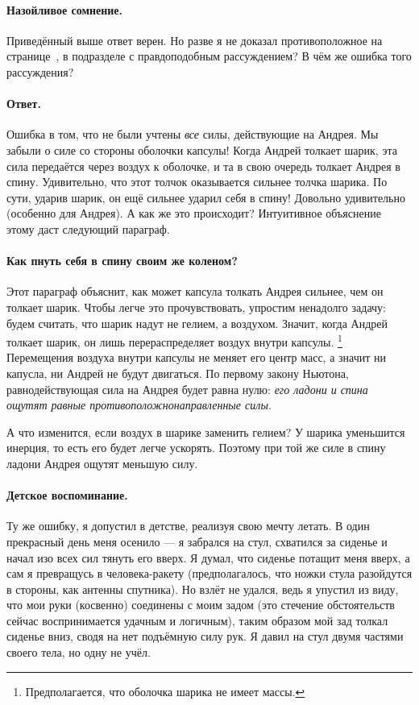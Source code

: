 \paragraph{Назойливое сомнение.}
Приведённый выше ответ верен.
Но разве я не доказал противоположное на странице~\pageref{Првдоподобное рассуждение}, в подразделе с правдоподобным рассуждением?
В чём же ошибка того рассуждения?

\paragraph{Ответ.}
Ошибка в том, что не были учтены \emph{все} силы, действующие на Андрея.
Мы забыли о силе со стороны оболочки капсулы!
Когда Андрей толкает шарик, эта сила передаётся через воздух к оболочке, и та в свою очередь толкает Андрея в спину.
Удивительно, что этот толчок оказывается сильнее толчка шарика.
По сути, ударив шарик, он ещё сильнее ударил себя в спину!
Довольно удивительно (особенно для Андрея).
А как же это происходит?
Интуитивное объяснение этому даст следующий параграф.

\paragraph{Как пнуть себя в спину своим же коленом?}
Этот параграф объяснит, как может капсула толкать Андрея сильнее, чем он толкает шарик.
Чтобы легче это прочувствовать, упростим ненадолго задачу:
будем считать, что шарик надут не гелием, а воздухом.
Значит, когда Андрей толкает шарик, он лишь перераспределяет воздух внутри капсулы.%
\footnote{Предполагается, что оболочка шарика не имеет массы.}
Перемещения воздуха внутри капсулы не меняет его центр масс, а значит ни капусла, ни Андрей не будут двигаться.
По первому закону Ньютона, равнодействующая сила на Андрея будет равна нулю: \emph{его ладони и спина ощутят равные противоположнонаправленные силы}.

А что изменится, если воздух в шарике заменить гелием?
У шарика уменьшится инерция, то есть его будет легче ускорять.
Поэтому при той же силе в спину ладони Андрея ощутят меньшую силу.

\paragraph{Детское воспоминание.}
Ту же ошибку, я допустил в детстве, реализуя свою мечту летать.
В один прекрасный день меня осенило --- я забрался на стул, схватился за сиденье и начал изо всех сил тянуть его вверх.
Я думал, что сиденье потащит меня вверх, а сам я превращусь в человека-ракету (предполагалось, что ножки стула разойдутся в стороны, как антенны спутника).
Но взлёт не удался, ведь я упустил из виду, что мои руки (косвенно) соединены с моим задом
(это стечение обстоятельств сейчас воспринимается удачным и логичным),
таким образом мой зад толкал сиденье вниз, сводя на нет подъёмную силу рук.
Я давил на стул двумя частями своего тела, но одну не учёл.


